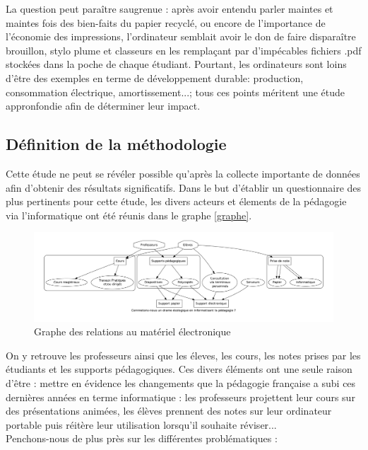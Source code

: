 \documentclass[a4paper,11pt,french]{article}
\begin{document}
La question peut paraître saugrenue : après avoir entendu parler maintes et maintes fois des bien-faits du papier recyclé, ou encore de l'importance de l'économie des impressions, l'ordinateur semblait avoir le don de faire disparaître brouillon, stylo plume et classeurs en les remplaçant par d'impécables fichiers .pdf stockées dans la poche de chaque étudiant. Pourtant, les ordinateurs sont loins d'être des exemples en terme de développement durable: production, consommation électrique, amortissement...; tous ces points méritent une étude appronfondie afin de déterminer leur impact.\\

\subsection{Définition de la méthodologie}
Cette étude ne peut se révéler possible qu'après la collecte importante de données afin d'obtenir des résultats significatifs. Dans le but d'établir un questionnaire des plus pertinents pour cette étude, les divers acteurs et élements de la pédagogie via l'informatique ont été réunis dans le graphe \vref{graphe}.\\

\begin{figure}[h!]
\includegraphics[width=\textwidth]{graphe.png}
\caption{Graphe des relations au matériel électronique}
\label{graphe}
\end{figure}

On y retrouve les professeurs ainsi que les éleves, les cours, les notes prises par les étudiants et les supports pédagogiques. Ces divers éléments ont une seule raison d'être : mettre en évidence les changements que la pédagogie française a subi ces dernières années en terme informatique : les professeurs projettent leur cours sur des présentations animées, les élèves prennent des notes sur leur ordinateur portable puis réitère leur utilisation lorsqu'il souhaite réviser...\\

Penchons-nous de plus près sur les différentes problématiques :
\end{document}
